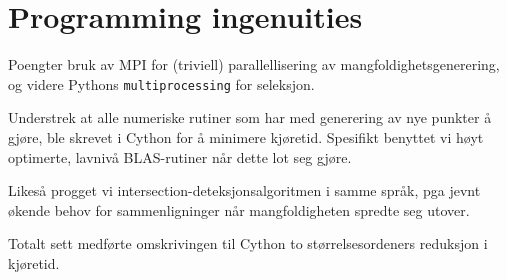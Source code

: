 \section{Programming ingenuities}
\label{sec:programming_ingenuities}

\begin{framed}
    Poengter bruk av MPI for (triviell) parallellisering av mangfoldighetsgenerering,
    og videre Pythons \texttt{multiprocessing} for seleksjon.

    Understrek at alle numeriske rutiner som har med generering av nye punkter å
    gjøre, ble skrevet i Cython for å minimere kjøretid. Spesifikt
    benyttet vi høyt optimerte, lavnivå BLAS-rutiner når dette lot seg gjøre.

    Likeså progget vi intersection-deteksjonsalgoritmen i samme språk,
    pga jevnt økende behov for sammenligninger når mangfoldigheten spredte seg
    utover.

    Totalt sett medførte omskrivingen til Cython to størrelsesordeners reduksjon
    i kjøretid.
\end{framed}
